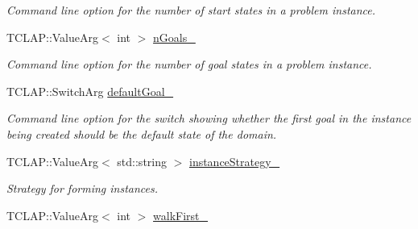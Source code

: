 \begin{DoxyCompactItemize}
\begin{DoxyCompactList}\small\item\em Command line option for the number of start states in a problem instance. \end{DoxyCompactList}\item 
T\+C\+L\+A\+P\+::\+Value\+Arg$<$ int $>$ \hyperlink{structslb_1_1core_1_1commandLine_1_1CommandLine_a68720f2ac1005479c84cc6cd681696e3}{n\+Goals\+\_\+}\hypertarget{structslb_1_1core_1_1commandLine_1_1CommandLine_a68720f2ac1005479c84cc6cd681696e3}{}\label{structslb_1_1core_1_1commandLine_1_1CommandLine_a68720f2ac1005479c84cc6cd681696e3}

\begin{DoxyCompactList}\small\item\em Command line option for the number of goal states in a problem instance. \end{DoxyCompactList}\item 
T\+C\+L\+A\+P\+::\+Switch\+Arg \hyperlink{structslb_1_1core_1_1commandLine_1_1CommandLine_a7157af3d110066e82e11493e93e37050}{default\+Goal\+\_\+}\hypertarget{structslb_1_1core_1_1commandLine_1_1CommandLine_a7157af3d110066e82e11493e93e37050}{}\label{structslb_1_1core_1_1commandLine_1_1CommandLine_a7157af3d110066e82e11493e93e37050}

\begin{DoxyCompactList}\small\item\em Command line option for the switch showing whether the first goal in the instance being created should be the default state of the domain. \end{DoxyCompactList}\item 
T\+C\+L\+A\+P\+::\+Value\+Arg$<$ std\+::string $>$ \hyperlink{structslb_1_1core_1_1commandLine_1_1CommandLine_afb86ebfa1c56ebd011324d7526f8dd55}{instance\+Strategy\+\_\+}\hypertarget{structslb_1_1core_1_1commandLine_1_1CommandLine_afb86ebfa1c56ebd011324d7526f8dd55}{}\label{structslb_1_1core_1_1commandLine_1_1CommandLine_afb86ebfa1c56ebd011324d7526f8dd55}

\begin{DoxyCompactList}\small\item\em Strategy for forming instances. \end{DoxyCompactList}\item 
T\+C\+L\+A\+P\+::\+Value\+Arg$<$ int $>$ \hyperlink{structslb_1_1core_1_1commandLine_1_1CommandLine_ac2fb1ee8b388aaca840a77b78bbf801c}{walk\+First\+\_\+}\hypertarget{structslb_1_1core_1_1commandLine_1_1CommandLine_ac2fb1ee8b388aaca840a77b78bbf801c}{}\label{structslb_1_1core_1_1commandLine_1_1CommandLine_ac2fb1ee8b388aaca840a77b78bbf801c}


\end{DoxyCompactItemize}
